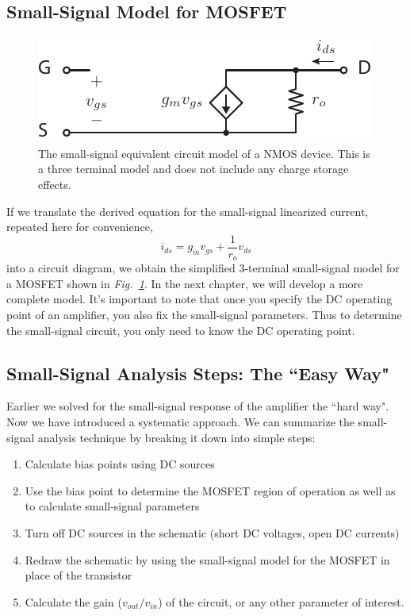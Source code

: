 \subsection{Small-Signal Model for MOSFET}
\begin{figure}[tb]
\centering
\includegraphics[scale=1]{mos3term_ac_nocap}
\caption{The small-signal equivalent circuit model of a NMOS device.  This is a three terminal model and does not include any charge storage effects.}
\label{fig:mos3term_ac_nocap}
\end{figure}
If we translate the derived equation for the small-signal linearized current, repeated here for convenience,
    \begin{equation}
        {i_{ds}} = {g_m}{v_{gs}} + \frac{1}{{{r_o}}}{v_{ds}}
    \end{equation}
into a circuit diagram, we obtain the simplified  3-terminal small-signal model for a MOSFET shown in \emph{Fig.~\ref{fig:mos3term_ac_nocap}}.  In the next chapter, we will develop a more complete model.  It's important to note that once you specify the DC operating point of an amplifier, you also fix the small-signal parameters.  Thus to determine the small-signal circuit, you only need to know the DC operating point.
\subsection{Small-Signal Analysis Steps:  The ``Easy Way"}
Earlier we solved for the small-signal response of the amplifier the ``hard way".  Now we have introduced a systematic approach.  We can summarize the small-signal analysis technique by breaking it down into simple steps:
    \begin{enumerate}
    	\item  Calculate bias points using DC sources
    	\item  Use the bias point to determine the MOSFET region of operation as well as to calculate small-signal parameters
    	\item  Turn off DC sources in the schematic (short DC voltages, open DC currents)
    	\item  Redraw the schematic by using the small-signal model for the MOSFET in place of the transistor
    	\item  Calculate the gain ($v_{out}/v_{in}$) of the circuit, or any other parameter of interest.
    \end{enumerate}
